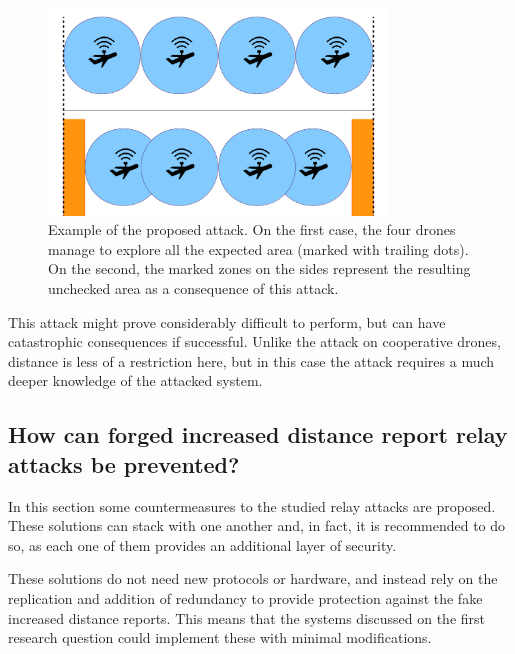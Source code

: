 \documentclass{article}
\begin{document}
\begin{description}
  \begin{figure}[h!]
  \centering
    \includegraphics[width=0.8\textwidth]{images/attack2.png}
  \caption{Example of the proposed attack. On the first case, the four drones manage to explore all the expected area (marked with trailing dots). On the second, the marked zones on the sides represent the resulting unchecked area as a consequence of this attack.}
  \label{fig:attackexample2}
\end{figure}

This attack might prove considerably difficult to perform, but can have catastrophic consequences if successful. Unlike the attack on cooperative drones, distance is less of a restriction here, but in this case the attack requires a much deeper knowledge of the attacked system.

\end{description}



















\subsection{How can forged increased distance report relay attacks be prevented?}

In this section some countermeasures to the studied relay attacks are proposed. These solutions can stack with one another and, in fact, it is recommended to do so, as each one of them provides an additional layer of security.

These solutions do not need new protocols or hardware, and instead rely on the replication and addition of redundancy to provide protection against the fake increased distance reports. This means that the systems discussed on the first research question could implement these with minimal modifications.
\end{document}
